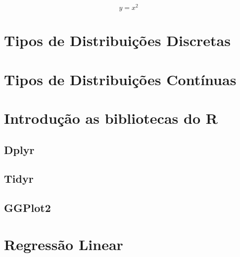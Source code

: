 \documentclass[
]{book}
\begin{document}
\[ y=x^2\]

\hypertarget{tipos-de-distribuiuxe7uxf5es-discretas}{%
\chapter{Tipos de Distribuições Discretas}\label{tipos-de-distribuiuxe7uxf5es-discretas}}

\hypertarget{tipos-de-distribuiuxe7uxf5es-contuxednuas}{%
\chapter{Tipos de Distribuições Contínuas}\label{tipos-de-distribuiuxe7uxf5es-contuxednuas}}

\hypertarget{introduuxe7uxe3o-as-bibliotecas-do-r}{%
\chapter{Introdução as bibliotecas do R}\label{introduuxe7uxe3o-as-bibliotecas-do-r}}

\hypertarget{dplyr}{%
\section{Dplyr}\label{dplyr}}

\hypertarget{tidyr}{%
\section{Tidyr}\label{tidyr}}

\hypertarget{ggplot2}{%
\section{GGPlot2}\label{ggplot2}}

\hypertarget{regressuxe3o-linear}{%
\chapter{Regressão Linear}\label{regressuxe3o-linear}}

  
\end{document}

